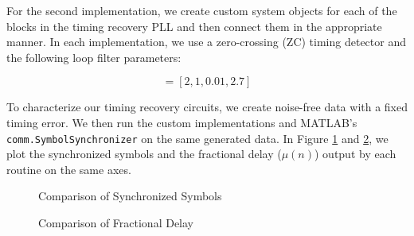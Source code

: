 \documentclass{article}
\begin{document}
\noindent For the second implementation, we create custom system objects for each of the blocks in the timing recovery PLL and then connect them in the appropriate manner. In each implementation, we use a zero-crossing (ZC) timing detector and the following loop filter parameters:

\begin{equation*}
	[N, \zeta, B_{loop}, G_D] = [2, 1, 0.01, 2.7]
\end{equation*}

\noindent To characterize our timing recovery circuits, we create noise-free data with a fixed timing error. We then run the custom implementations and MATLAB's \texttt{comm.SymbolSynchronizer} on the same generated data. In Figure \ref{fig::symbol_sync_no_noise} and \ref{fig::fractional_delay_no_noise}, we plot the synchronized symbols and the fractional delay ($\mu(n)$) output by each routine on the same axes.

\begin{figure}[H]
	\centerline{}
	\caption{Comparison of Synchronized Symbols}
	\label{fig::symbol_sync_no_noise}
\end{figure}

\begin{figure}[H]
	\centerline{}
	\caption{Comparison of Fractional Delay}
	\label{fig::fractional_delay_no_noise}
\end{figure}
\end{document}
